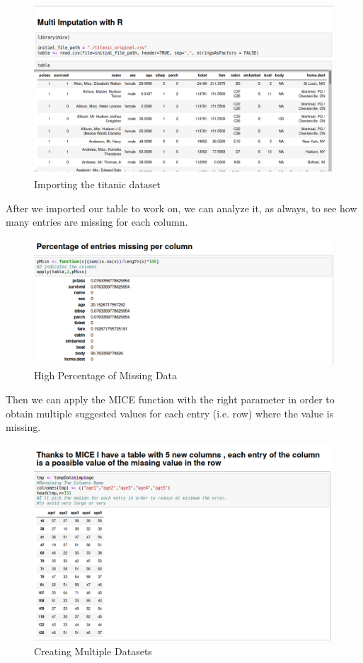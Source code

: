 \documentclass[a4paper]{article}
\begin{document}
\begin{figure}[htbp]
\centering
\includegraphics[width = \textwidth]{images/R1.png}
\caption{Importing the titanic dataset}
\end{figure}
\newpage
\par\noindent After we imported our table to work on, we can analyze it, as always, to see how many entries are missing for each column.
\begin{figure}[htbp]
\centering
\includegraphics[width = \textwidth]{images/R2.png}
\caption{High Percentage of Missing Data}
\end{figure}
\par\noindent Then we can apply the MICE function with the right parameter in order to obtain multiple suggested values for each entry (i.e. row) where the value is missing.
\begin{figure}[htbp]
\centering
\includegraphics[width = \textwidth]{images/R3.png}
\caption{Creating Multiple Datasets}
\end{figure}
\end{document}

